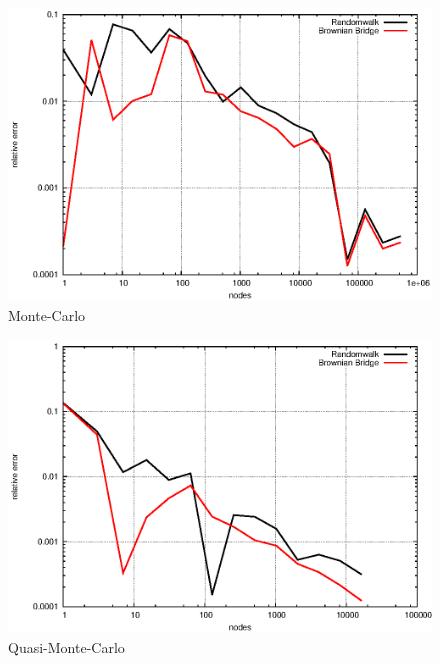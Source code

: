 \documentclass[]{article}
\begin{document}
\begin{figure}[!ht]
\includegraphics{task16_mc}
\caption{Monte-Carlo}
\label{fig:Task16e}
\end{figure}

\begin{figure}[!ht]
\includegraphics{task16_qmc}
\caption{Quasi-Monte-Carlo}
\label{fig:Task16f}
\end{figure}
\clearpage
\end{document}

